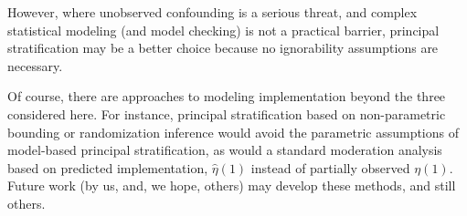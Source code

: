 \documentclass{article}\usepackage[]{graphicx}\usepackage[]{color}
\begin{document}
However, where unobserved confounding is a serious threat, and complex
statistical modeling (and model checking) is not a practical barrier,
principal stratification may be a better choice because no
ignorability assumptions are necessary.

Of course, there are approaches to modeling implementation beyond
the three considered here. For instance, principal stratification
based on non-parametric bounding \citep{bounding} or randomization
inference \citep{nolen} would avoid the parametric assumptions of
model-based principal stratification, as would a standard moderation
analysis based on predicted implementation, $\hat{\eta}(1)$ instead of
partially observed $\eta(1)$.
Future work (by us, and, we hope, others) may develop these methods,
and still others.


\end{document}
